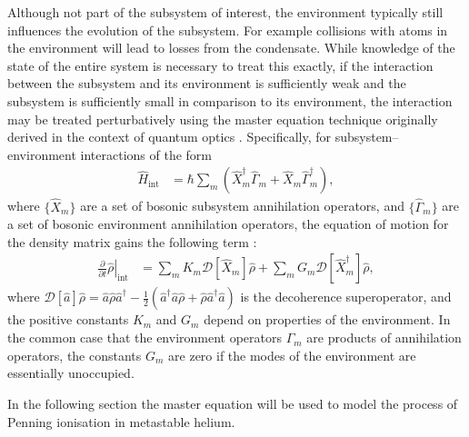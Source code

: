 Although not part of the subsystem of interest, the environment typically still influences the evolution of the subsystem.  For example collisions with atoms in the environment will lead to losses from the condensate.  While knowledge of the state of the entire system is necessary to treat this exactly, if the interaction between the subsystem and its environment is sufficiently weak and the subsystem is sufficiently small in comparison to its environment, the interaction may be treated perturbatively using the master equation technique originally derived in the context of quantum optics \citep{Senitzky:1960,Senitzky:1961}.  Specifically, for subsystem--environment interactions of the form
\begin{align}
    \hat{H}_\text{int} &= \hbar \sum_m \left(\hat{X}_m^\dagger \hat{\Gamma}_m^{\phantom{\dagger}} + \hat{X}_m^{\phantom{\dagger}} \hat{\Gamma}_m^\dagger \right), \label{BackgroundTheory:GeneralSubsystemEnvironmentCoupling}
\end{align}
where $\{\hat{X}_m\}$ are a set of bosonic subsystem annihilation operators, and $\{\hat{\Gamma}_m\}$ are a set of bosonic environment annihilation operators, the equation of motion for the density matrix gains the following term \citep[Chapter 5]{GardinerQN}:
\begin{align}
    \left.\frac{\partial}{\partial t} \hat{\rho}\right|_\text{int} &= \sum_m K_m \mathcal{D}[\hat{X}_m]\hat{\rho} + \sum_m G_m \mathcal{D}[\hat{X}_m^\dagger]\hat{\rho}, \label{BackgroundTheory:LindbladForm}
\end{align}
where $\mathcal{D}[\hat{a}]\hat{\rho} = \hat{a} \hat{\rho} \hat{a}^\dagger - \frac{1}{2}\left(\hat{a}^\dagger \hat{a} \hat{\rho} + \hat{\rho} \hat{a}^\dagger \hat{a} \right)$ is the decoherence superoperator, and the positive constants $K_m$ and $G_m$ depend on properties of the environment.  In the common case that the environment operators $\hat{\Gamma}_m$ are products of annihilation operators, the constants $G_m$ are zero if the modes of the environment are essentially unoccupied.

In the following section the master equation will be used to model the process of Penning ionisation in metastable helium.

